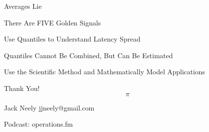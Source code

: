 
\begin{frame}[standout]
    \small

    Averages Lie

    There Are FIVE Golden Signals

    Use Quantiles to Understand Latency Spread

    Quantiles Cannot Be Combined, But Can Be Estimated

    Use the Scientific Method and Mathematically Model Applications
\end{frame}

\begin{frame}[standout]
    Thank You!
    $$\pi$$

    \small
    Jack Neely
    jjneely@gmail.com

    Podcast: operations.fm
\end{frame}

